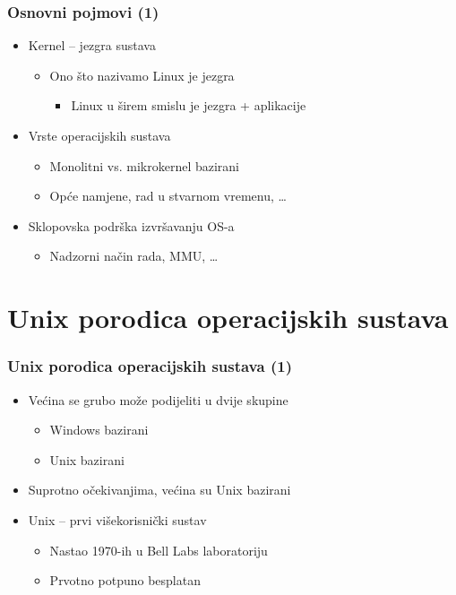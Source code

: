 \documentclass{beamer}
\begin{document}
\begin{frame}[t]
\frametitle{Osnovni pojmovi (1)}
\begin{itemize}
  \item Kernel -- jezgra sustava
  \begin{itemize}
    \item Ono što nazivamo Linux je jezgra
    \begin{itemize}
      \item Linux u širem smislu je jezgra + aplikacije
    \end{itemize}
  \end{itemize}
  \item Vrste operacijskih sustava
  \begin{itemize}
    \item Monolitni vs. mikrokernel bazirani
    \item Opće namjene, rad u stvarnom vremenu, \ldots
  \end{itemize}
  \item Sklopovska podrška izvršavanju OS-a
  \begin{itemize}
    \item Nadzorni način rada, MMU, \ldots
  \end{itemize}
\end{itemize}
\end{frame}

\section{Unix porodica operacijskih sustava}
\begin{frame}[t]
\frametitle{Unix porodica operacijskih sustava (1)}
\begin{itemize}
  \item Većina se grubo može podijeliti u dvije skupine
  \begin{itemize}
    \item Windows bazirani
    \item Unix bazirani
  \end{itemize}
  \item Suprotno očekivanjima, većina su Unix bazirani
  \item Unix – prvi višekorisnički sustav
  \begin{itemize}
    \item Nastao 1970-ih u Bell Labs laboratoriju
    \item Prvotno potpuno besplatan
  \end{itemize}
\end{itemize}
\end{frame} 
\end{document}
